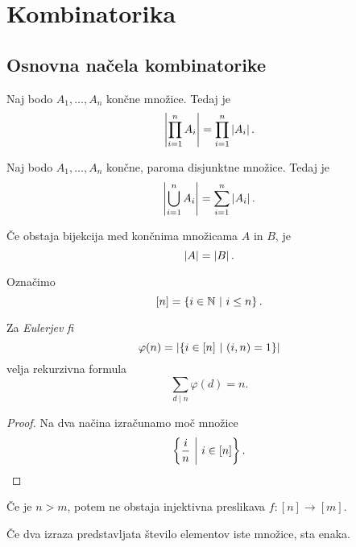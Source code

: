 \section{Kombinatorika}

\subsection{Osnovna načela kombinatorike}


\begin{trditev}
Naj bodo $A_1, \dots, A_n$ končne množice. Tedaj je
\[
\left\lvert \prod_{i=1}^n A_i\right\rvert = \prod_{i=1}^n \left\lvert A_i\right\rvert.
\]
\end{trditev}

\begin{trditev}
Naj bodo $A_1, \dots, A_n$ končne, paroma disjunktne množice. Tedaj
je
\[
\left\lvert \bigcup_{i=1}^n A_i\right\rvert = \sum_{i=1}^n \left\lvert A_i\right\rvert.
\]
\end{trditev}

\begin{trditev}
Če obstaja bijekcija med končnima množicama $A$ in $B$, je
\[
\left\lvert A\right\rvert = \left\lvert B\right\rvert.
\]
\end{trditev}

\begin{definicija}
Označimo
\[
[n] = \left\{i \in \mathbb{N}~\middle\vert~i \leq n\right\}.
\]
\end{definicija}

\begin{trditev}
Za \emph{Eulerjev fi}
\[
\varphi(n) = \left\lvert \left\{i \in [n]~\middle\vert~(i,n) = 1\right\}\right\rvert
\]
velja rekurzivna formula
\[
\sum_{d \mid n} \varphi(d) = n.
\]
\end{trditev}

\begin{proof}
Na dva načina izračunamo moč množice
\[
\left\{\frac{i}{n}~\middle\vert~i \in [n]\right\}. \qedhere
\]
\end{proof}

\begin{izrek}
Če je $n > m$, potem ne obstaja injektivna preslikava
$f \colon [n] \to [m]$.
\end{izrek}

\obvs

\begin{trditev}
Če dva izraza predstavljata število elementov iste množice, sta
enaka.
\end{trditev}

